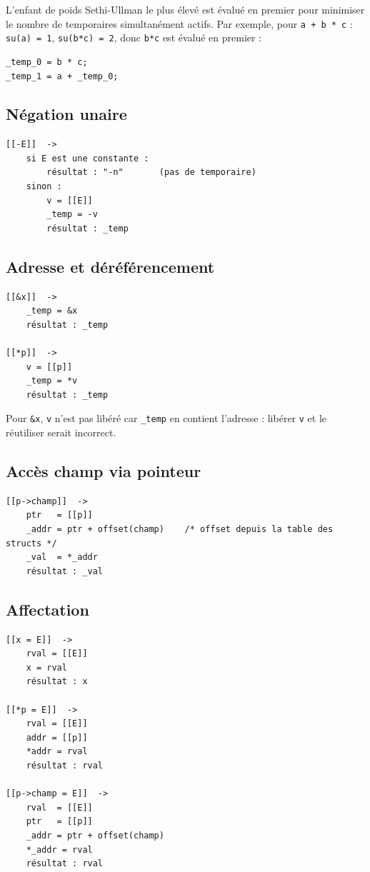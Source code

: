 \documentclass[12pt,a4paper]{article}
\begin{document}
L'enfant de poids Sethi-Ullman le plus élevé est évalué en premier pour minimiser le nombre de temporaires simultanément actifs. Par exemple, pour \texttt{a + b * c} : \texttt{su(a) = 1}, \texttt{su(b*c) = 2}, donc \texttt{b*c} est évalué en premier :

\begin{lstlisting}
_temp_0 = b * c;
_temp_1 = a + _temp_0;
\end{lstlisting}

\subsection{Négation unaire}

\begin{lstlisting}
[[-E]]  ->
    si E est une constante :
        résultat : "-n"       (pas de temporaire)
    sinon :
        v = [[E]]
        _temp = -v
        résultat : _temp
\end{lstlisting}

\subsection{Adresse et déréférencement}

\begin{lstlisting}
[[&x]]  ->
    _temp = &x
    résultat : _temp

[[*p]]  ->
    v = [[p]]
    _temp = *v
    résultat : _temp
\end{lstlisting}

Pour \texttt{\&x}, \texttt{v} n'est pas libéré car \texttt{\_temp} en contient l'adresse : libérer \texttt{v} et le réutiliser serait incorrect.

\subsection{Accès champ via pointeur}

\begin{lstlisting}
[[p->champ]]  ->
    ptr   = [[p]]
    _addr = ptr + offset(champ)    /* offset depuis la table des structs */
    _val  = *_addr
    résultat : _val
\end{lstlisting}

\subsection{Affectation}

\begin{lstlisting}
[[x = E]]  ->
    rval = [[E]]
    x = rval
    résultat : x

[[*p = E]]  ->
    rval = [[E]]
    addr = [[p]]
    *addr = rval
    résultat : rval

[[p->champ = E]]  ->
    rval  = [[E]]
    ptr   = [[p]]
    _addr = ptr + offset(champ)
    *_addr = rval
    résultat : rval
\end{lstlisting}
\end{document}
